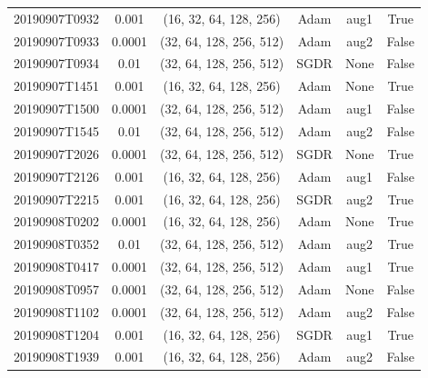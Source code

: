 \begin{table}[!ht]
\begin{adjustbox}{width=\columnwidth, center}
\begin{tabular}{cccccc}
			20190907T0932 &        0.001 &   (16, 32, 64, 128, 256) &      Adam &                  aug1 &                  True \\
			20190907T0933 &       0.0001 &  (32, 64, 128, 256, 512) &      Adam &                  aug2 &                   False \\
			20190907T0934 &         0.01 &  (32, 64, 128, 256, 512) &      SGDR &                  None &                  False \\
			20190907T1451 &        0.001 &   (16, 32, 64, 128, 256) &      Adam &                  None &                  True \\
			20190907T1500 &       0.0001 &  (32, 64, 128, 256, 512) &      Adam &                  aug1 &                   False \\
			20190907T1545 &         0.01 &  (32, 64, 128, 256, 512) &      Adam &                  aug2 &                   False \\
			20190907T2026 &       0.0001 &  (32, 64, 128, 256, 512) &      SGDR &                  None &                  True \\
			20190907T2126 &        0.001 &   (16, 32, 64, 128, 256) &      Adam &                  aug1 &                   False \\
			20190907T2215 &        0.001 &   (16, 32, 64, 128, 256) &      SGDR &                  aug2 &                  True \\
			20190908T0202 &       0.0001 &   (16, 32, 64, 128, 256) &      Adam &                  None &                  True \\
			20190908T0352 &         0.01 &  (32, 64, 128, 256, 512) &      Adam &                  aug2 &                  True \\
			20190908T0417 &       0.0001 &  (32, 64, 128, 256, 512) &      Adam &                  aug1 &                  True \\
			20190908T0957 &       0.0001 &  (32, 64, 128, 256, 512) &      Adam &                  None &                   False \\
			20190908T1102 &       0.0001 &  (32, 64, 128, 256, 512) &      Adam &                  aug2 &                  False \\
			20190908T1204 &        0.001 &   (16, 32, 64, 128, 256) &      SGDR &                  aug1 &                  True \\
			20190908T1939 &        0.001 &   (16, 32, 64, 128, 256) &      Adam &                  aug2 &                   False \\

\end{tabular}
\end{adjustbox}
\end{table}
